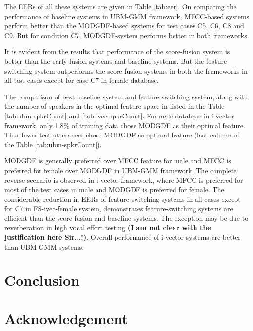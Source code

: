 \documentclass{article}
\begin{document}
\vspace{0.25cm}
The EERs of all these systems are given in Table \ref{tab:eer}. On comparing the performance of baseline systems in UBM-GMM framework, MFCC-based systems perform better than the MODGDF-based systems for test cases C5, C6, C8 and C9. But for condition C7, MODGDF-system performs better in both frameworks. 

\vspace{0.25cm}
It is evident from the results that performance of the score-fusion system is better than the early fusion systems and baseline systems. But the feature switching system outperforms the score-fusion systems in both the frameworks in all test cases except for case C7 in female database.

\vspace{0.25cm}
The comparison of best baseline system and feature switching system, along with the number of speakers in the optimal feature space in listed in the Table \ref{tab:ubm-spkrCount} and \ref{tab:ivec-spkrCount}. For male database in i-vector framework, only 1.8\% of training data chose MODGDF as their optimal feature. Thus fewer test utterances chose MODGDF as optimal feature (last column of the Table \ref{tab:ubm-spkrCount}). 

\vspace{0.25cm}
MODGDF is generally preferred over MFCC feature for male and MFCC is preferred for female over MODGDF in UBM-GMM framework. The complete reverse scenario is observed in i-vector framework, where MFCC is preferred for most of the test cases in male and MODGDF is preferred for female. The considerable reduction in EERs of feature-switching systems in all cases except for C7 in FS-ivec-female system, demonstrates feature-switching systems are efficient than the score-fusion and baseline systems. The exception may be due to reverberation in high vocal effort testing \cite{vocalEffort} {\bf (I am not clear with the justification here Sir...!)}. Overall performance of i-vector systems are better than UBM-GMM systems.  

\vspace{0.25cm}
\section{Conclusion}
\label{sec:conclude}
\vspace{0.25cm}
\section{Acknowledgement}
\label{sec:ack}


\clearpage 



\end{document}
